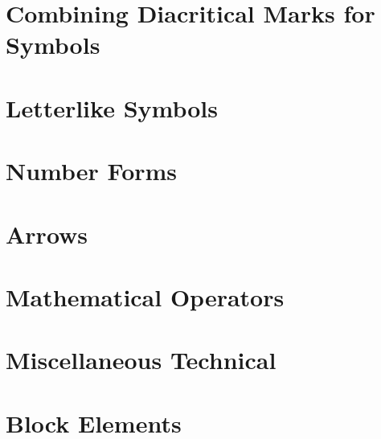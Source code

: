\documentclass{article}
\begin{document}
\section{Combining Diacritical Marks for Symbols}

\section{Letterlike Symbols}

\section{Number Forms}

\section{Arrows}

\section{Mathematical Operators}

\section{Miscellaneous Technical}

%
%
%
%
\section{Block Elements}
\end{document}
